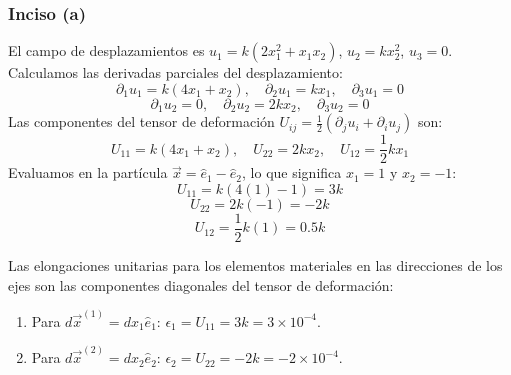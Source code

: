 \documentclass[a4paper]{article}
\begin{document}
\subsubsection*{Inciso (a)}
El campo de desplazamientos es $u_1 = k(2x_1^2 + x_1 x_2)$, $u_2 = k x_2^2$, $u_3 = 0$.
Calculamos las derivadas parciales del desplazamiento:
$$ \partial_1 u_1 = k(4x_1 + x_2), \quad \partial_2 u_1 = k x_1, \quad \partial_3 u_1 = 0 $$
$$ \partial_1 u_2 = 0, \quad \partial_2 u_2 = 2k x_2, \quad \partial_3 u_2 = 0 $$
Las componentes del tensor de deformación $U_{ij} = \frac{1}{2}(\partial_j u_i + \partial_i u_j)$ son:
$$ U_{11} = k(4x_1 + x_2), \quad U_{22} = 2k x_2, \quad U_{12} = \frac{1}{2}k x_1 $$
Evaluamos en la partícula $\vec{x} = \hat{e}_1 - \hat{e}_2$, lo que significa $x_1 = 1$ y $x_2 = -1$:
$$ U_{11} = k(4(1) - 1) = 3k $$
$$ U_{22} = 2k(-1) = -2k $$
$$ U_{12} = \frac{1}{2}k(1) = 0.5k $$

Las elongaciones unitarias para los elementos materiales en las direcciones de los ejes son las componentes diagonales del tensor de deformación:
\begin{enumerate}
    \item Para $d\vec{x}^{(1)} = dx_1 \hat{e}_1$: $\epsilon_1 = U_{11} = 3k = 3 \times 10^{-4}$.
    \item Para $d\vec{x}^{(2)} = dx_2 \hat{e}_2$: $\epsilon_2 = U_{22} = -2k = -2 \times 10^{-4}$.
\end{enumerate}
\end{document}
